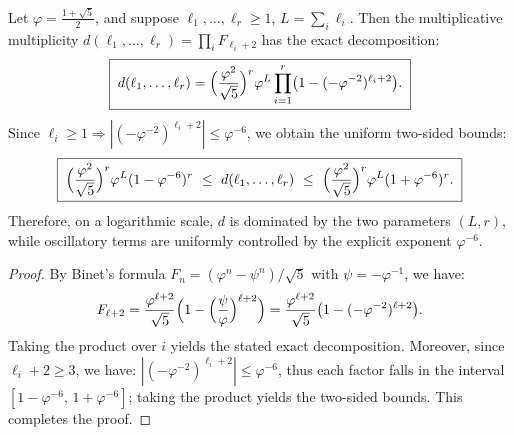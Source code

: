 \begin{proposition}\label{prop:pom-multiplicity-binet-two-parameter-normal-form}
Let $\varphi=\frac{1+\sqrt5}{2}$, and suppose $\ell_1,\dots,\ell_r\ge 1$, $L=\sum_i\ell_i$.
Then the multiplicative multiplicity $d(\ell_1,\dots,\ell_r)=\prod_i F_{\ell_i+2}$ has the exact decomposition:
\[
\boxed{\;
d(\ell_1,\dots,\ell_r)
=\Bigl(\frac{\varphi^2}{\sqrt5}\Bigr)^r\varphi^{L}\prod_{i=1}^r\bigl(1-(-\varphi^{-2})^{\ell_i+2}\bigr).\;}
\]
Since $\ell_i\ge 1\Rightarrow |(-\varphi^{-2})^{\ell_i+2}|\le \varphi^{-6}$, we obtain the uniform two-sided bounds:
\[
\boxed{\;
\Bigl(\frac{\varphi^2}{\sqrt5}\Bigr)^r\varphi^{L}(1-\varphi^{-6})^r
\ \le\
d(\ell_1,\dots,\ell_r)
\ \le\
\Bigl(\frac{\varphi^2}{\sqrt5}\Bigr)^r\varphi^{L}(1+\varphi^{-6})^r.\;}
\]
Therefore, on a logarithmic scale, $d$ is dominated by the two parameters $(L,r)$, while oscillatory terms are uniformly controlled by the explicit exponent $\varphi^{-6}$.
\end{proposition}
\begin{proof}
By Binet's formula $F_n=(\varphi^n-\psi^n)/\sqrt5$ with $\psi=-\varphi^{-1}$, we have:
\[
F_{\ell+2}=\frac{\varphi^{\ell+2}}{\sqrt5}\Bigl(1-\Bigl(\frac{\psi}{\varphi}\Bigr)^{\ell+2}\Bigr)
=\frac{\varphi^{\ell+2}}{\sqrt5}\bigl(1-(-\varphi^{-2})^{\ell+2}\bigr).
\]
Taking the product over $i$ yields the stated exact decomposition.
Moreover, since $\ell_i+2\ge 3$, we have:
\(
|(-\varphi^{-2})^{\ell_i+2}|\le \varphi^{-6}
\),
thus each factor falls in the interval $[1-\varphi^{-6},\,1+\varphi^{-6}]$; taking the product yields the two-sided bounds. This completes the proof.
\end{proof}

